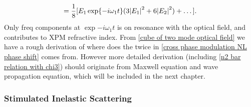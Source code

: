 \documentclass[12pt]{extarticle}
\numberwithin{equation}{section}
\numberwithin{figure}{section}
\numberwithin{table}{section}
\newcommand{\<}{\langle}
\renewcommand{\>}{\rangle}
\theoremstyle{definition}
\begin{document}
\begin{itemize}
\begin{equation}
\begin{split}
                        =\frac{1}{8} [E_1\exp{-i\omega_1t}(3\abs{E_1}^2+6\abs{E_2}^2) + \dots].
                    \end{split}
                    \label{cube of two mode optical field}
                \end{equation}
                Only freq components at $\exp{-i\omega_1t}$ is on resonance with the optical field, and contributes to XPM refractive index. From \autoref{cube of two mode optical field} we have a rough derivation of where does the twice in \autoref{cross phase modulation NL phase shift} comes from. However more detailed derivation (including \autoref{n2 bar relation with chi3}) should originate from Maxwell equation and wave propagation equation, which will be included in the next chapter.
            \end{itemize}
        \subsubsection{Stimulated Inelastic Scattering}
\end{document}
